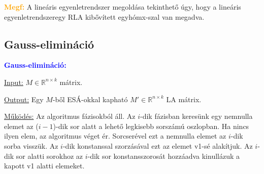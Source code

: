 \documentclass[../szamtud.tex]{subfiles}
\begin{document}
        \textcolor{orange}{\textbf{Megf:}} A lineáris egyenletrendszer megoldása tekinthető úgy, hogy a lineáris egyenletrendszeregy RLA kibővített egyhómx-szal van megadva.

    \subsection{Gauss-elimináció}

        \textcolor{blue}{\textbf{Gauss-elimináció:}} 

        \underline{Input:} $M \in \mathbb{R}^{n \times k}$ mátrix.

        \underline{Output:} Egy $M$-ből ESÁ-okkal kapható $M' \in \mathbb{R}^{n \times k}$ LA mátrix.

        \underline{Működés:} Az algoritmus fázisokból áll. Az $i$-dik fázisban keresünk egy nemnulla elemet az ($i-1$)-dik sor alatt a lehető legkisebb sorszámú oszlopban. Ha nincs ilyen elem, az algoritmus véget ér. Sorcserével ezt a nemnulla elemet az $i$-dik sorba visszük. Az $i$-dik konstanssal szorzásával ezt az elemet v1-sé alakítjuk. Az $i$-dik sor alatti sorokhoz az $i$-dik sor konstansszorosát hozzáadva kinullázuk a kapott v1 alatti elemeket.
\end{document}
